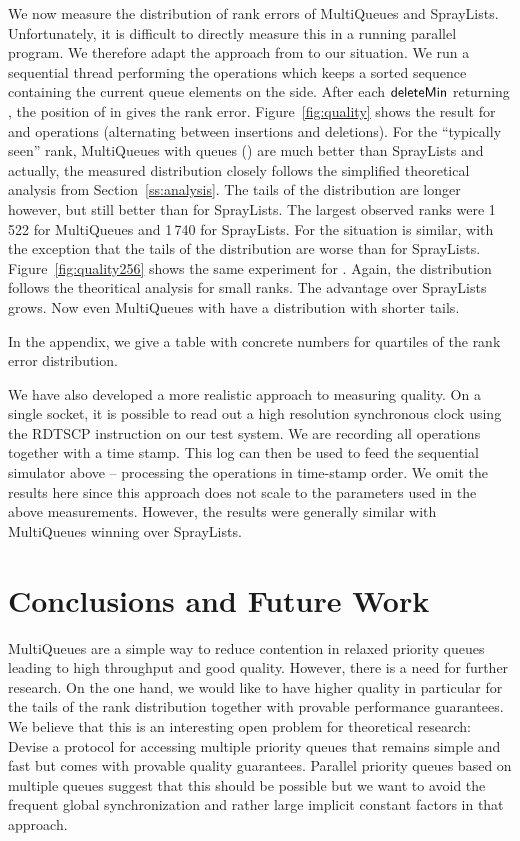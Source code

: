 \documentclass[a4paper,12pt]{article}
\newcommand{\Id}[1]{\ensuremath{\text{{\sf #1}}}}
\begin{document}
We now measure the distribution of rank errors of MultiQueues and SprayLists. Unfortunately, it is difficult to directly measure this in a running parallel program. We therefore adapt the approach from \cite{AKLS14} to our situation. We run a sequential thread performing the operations which keeps a sorted sequence  containing the current queue elements on the side. After each \Id{deleteMin} returning , the position of  in  gives the rank error.
Figure~\ref{fig:quality} shows the result for  and  operations (alternating between insertions and deletions). For the ``typically seen'' rank, MultiQueues with  queues () are much better than SprayLists and actually, the measured distribution closely follows the simplified theoretical analysis from Section~\ref{ss:analysis}.
The tails of the distribution are longer however, but still better than for SprayLists.
The largest observed ranks were 1\,522 for MultiQueues and 1\,740 for SprayLists. For  the situation is similar, with the exception that the tails of the distribution are worse than for SprayLists.
Figure~\ref{fig:quality256} shows the same experiment for .
Again, the distribution follows the theoritical analysis for small ranks.
The advantage over SprayLists grows. Now even MultiQueues with  have a distribution with shorter tails.

In the appendix, we give a table with concrete numbers for quartiles of the rank error distribution.



We have also developed a more realistic approach to measuring quality. On a single socket, it is possible to read out a high resolution synchronous clock using the RDTSCP instruction on our test system.
We are recording all operations together with a time stamp. This log can then be used to feed the sequential simulator above -- processing the operations in time-stamp order. We omit the results here since this approach does not scale
to the parameters used in the above measurements. However, the results were generally similar with MultiQueues winning over SprayLists.


\section{Conclusions and Future Work}
\label{s:conclusions}

MultiQueues are a simple way to reduce contention in relaxed priority queues leading to high throughput and good quality. However, there is a need for further research. On the one hand, we would like to have higher quality in particular for the tails of the rank distribution together with provable performance guarantees. We believe that this is an interesting open problem for theoretical research: Devise a protocol for accessing multiple priority queues 
that remains simple and fast but comes with provable quality guarantees.
Parallel priority queues based on multiple queues suggest that this should be possible \cite{San98a} but we want to avoid the frequent global synchronization and rather large implicit constant factors in that approach.
\end{document}
